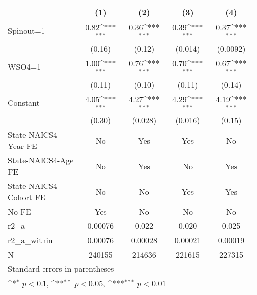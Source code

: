 {
\def\sym#1{\ifmmode^{#1}\else\(^{#1}\)\fi}
\begin{tabular}{l*{4}{c}}
\hline\hline
                    &\multicolumn{1}{c}{(1)}         &\multicolumn{1}{c}{(2)}         &\multicolumn{1}{c}{(3)}         &\multicolumn{1}{c}{(4)}         \\
\hline
Spinout=1           &        0.82\sym{***}&        0.36\sym{***}&        0.39\sym{***}&        0.37\sym{***}\\
                    &      (0.16)         &      (0.12)         &     (0.014)         &    (0.0092)         \\
[1em]
WSO4=1              &        1.00\sym{***}&        0.76\sym{***}&        0.70\sym{***}&        0.67\sym{***}\\
                    &      (0.11)         &      (0.10)         &      (0.11)         &      (0.14)         \\
[1em]
Constant            &        4.05\sym{***}&        4.27\sym{***}&        4.29\sym{***}&        4.19\sym{***}\\
                    &      (0.30)         &     (0.028)         &     (0.016)         &      (0.15)         \\
[1em]
State-NAICS4-Year FE&          No         &         Yes         &         Yes         &          No         \\
[1em]
State-NAICS4-Age FE &          No         &         Yes         &          No         &         Yes         \\
[1em]
State-NAICS4-Cohort FE&          No         &          No         &         Yes         &         Yes         \\
[1em]
No FE               &         Yes         &          No         &          No         &          No         \\
\hline
r2\_a                &     0.00076         &       0.022         &       0.020         &       0.025         \\
r2\_a\_within         &     0.00076         &     0.00028         &     0.00021         &     0.00019         \\
N                   &      240155         &      214636         &      221615         &      227315         \\
\hline\hline
\multicolumn{5}{l}{\footnotesize Standard errors in parentheses}\\
\multicolumn{5}{l}{\footnotesize \sym{*} \(p<0.1\), \sym{**} \(p<0.05\), \sym{***} \(p<0.01\)}\\
\end{tabular}
}

